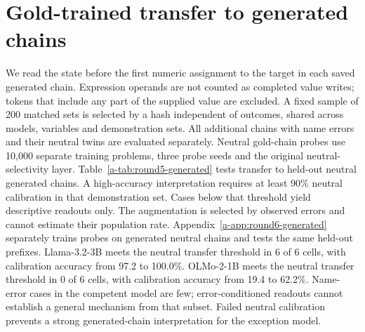 \section{Gold-trained transfer to generated chains}
\label{a-app:round5-generated}
We read the state before the first numeric assignment to the target in each saved generated chain. Expression operands are not counted as completed value writes; tokens that include any part of the supplied value are excluded. A fixed sample of 200 matched sets is selected by a hash independent of outcomes, shared across models, variables and demonstration sets. All additional chains with name errors and their neutral twins are evaluated separately.
Neutral gold-chain probes use 10,000 separate training problems, three probe seeds and the original neutral-selectivity layer. Table~\ref{a-tab:round5-generated} tests transfer to held-out neutral generated chains. A high-accuracy interpretation requires at least 90\% neutral calibration in that demonstration set. Cases below that threshold yield descriptive readouts only. The augmentation is selected by observed errors and cannot estimate their population rate. Appendix~\ref{a-app:round6-generated} separately trains probes on generated neutral chains and tests the same held-out prefixes.
Llama-3.2-3B meets the neutral transfer threshold in 6 of 6 cells, with calibration accuracy from 97.2 to 100.0\%.
OLMo-2-1B meets the neutral transfer threshold in 0 of 6 cells, with calibration accuracy from 19.4 to 62.2\%.
Name-error cases in the competent model are few; error-conditioned readouts cannot establish a general mechanism from that subset. Failed neutral calibration prevents a strong generated-chain interpretation for the exception model.
